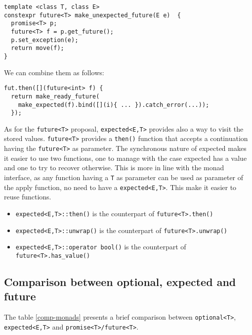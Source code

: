 \documentclass[a4paper,10pt]{article}
\newcommand{\cpp}[1]{\lstinline{#1}}
\begin{document}
\begin{lstlisting}
template <class T, class E>
constexpr future<T> make_unexpected_future(E e)  {
  promise<T> p;
  future<T> f = p.get_future();
  p.set_exception(e);
  return move(f);
}
\end{lstlisting}
\noindent
We can combine them as follows:

\begin{lstlisting}
fut.then([](future<int> f) { 
  return make_ready_future(
    make_expected(f).bind([](i){ ... }).catch_error(...));
  });
\end{lstlisting}

As for the \cpp{future<T>} proposal, \cpp{expected<E,T>} provides also a way to visit the stored values.
\cpp{future<T>} provides a \cpp{then()} function that accepts a continuation having the \cpp{future<T>} as parameter. The synchronous nature of expected makes it easier to use two functions, one to manage with the case expected has a value and one to try to recover otherwise. This is more in line with the monad interface, as any function having a \cpp{T} as parameter can be used as parameter of the apply function, no need to have a \cpp{expected<E,T>}. This make it easier to reuse functions. 

\begin{itemize}
 \item \cpp{expected<E,T>::then()} is the counterpart of \cpp{future<T>.then()}
 \item \cpp{expected<E,T>::unwrap()} is the counterpart of \cpp{future<T>.unwrap()}
 \item \cpp{expected<E,T>::operator bool()} is the counterpart of \cpp{future<T>.has_value()}
\end{itemize}

\subsection{Comparison between optional, expected and future}

The table \ref{comp-monads} presents a brief comparison between \cpp{optional<T>}, \cpp{expected<E,T>}  and \cpp{promise<T>/future<T>}.
\end{document}
